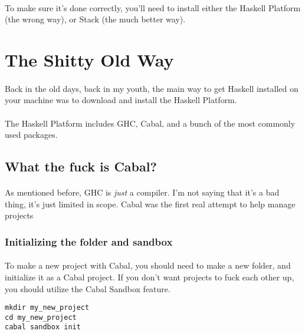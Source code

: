 \paragraph{}
To make sure it's done correctly, you'll need to install either the Haskell Platform (the wrong way), or Stack (the much better way). 


\section{The Shitty Old Way}
\paragraph{}
Back in the old days, back in my youth, the main way to get Haskell installed on your machine was to download and install the Haskell Platform. 

\paragraph{}
The Haskell Platform includes GHC, Cabal, and a bunch of the most commonly used packages.  

\subsection{What the fuck is Cabal?}
\paragraph{}
As mentioned before, GHC is \textit{just} a compiler.  I'm not saying that it's a bad thing, it's just limited in scope.  Cabal was the first real attempt to help manage projects

\subsubsection{Initializing the folder and sandbox}
\paragraph{}
To make a new project with Cabal, you should need to make a new folder, and initialize it as a Cabal project.  If you don't want projects to fuck each other up, you should utilize the Cabal Sandbox feature. 

\begin{verbatim}
mkdir my_new_project
cd my_new_project
cabal sandbox init
\end{verbatim}

